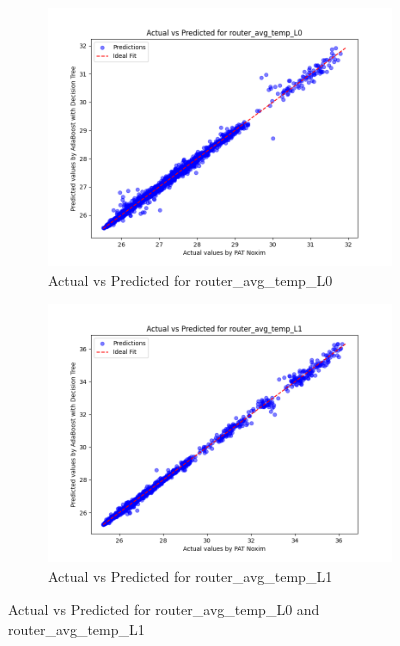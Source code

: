 \documentclass[conference]{IEEEtran}
\begin{document}
\begin{figure}[htbp]
    \begin{subfigure}{0.24\textwidth}
        \centering
        \includegraphics[width=\linewidth]{actual_vs_predicted_router_avg_temp_L0.png}
        \caption{Actual vs Predicted for router\_avg\_temp\_L0}
        \label{fig:actual_vs_predicted_router_avg_temp_L0}
    \end{subfigure}
    \hfill
    \begin{subfigure}{0.24\textwidth}
        \includegraphics[width=\linewidth]{actual_vs_predicted_router_avg_temp_L1.png}
        \caption{Actual vs Predicted for router\_avg\_temp\_L1}
        \label{fig:actual_vs_predicted_router_avg_temp_L1}
    \end{subfigure}

    \caption{Actual vs Predicted for router\_avg\_temp\_L0 and router\_avg\_temp\_L1}
    \label{fig:side_by_side_graphs_router_avg_temp}
\end{figure}
\end{document}
